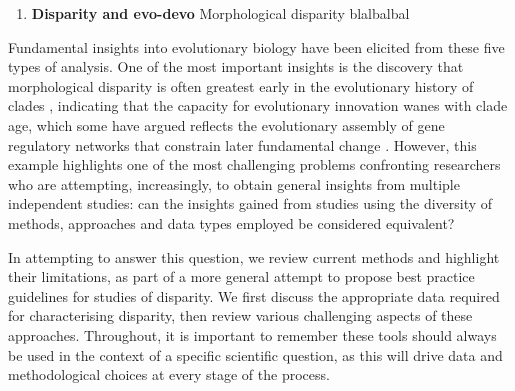 \documentclass[12pt,letterpaper]{article}
\begin{document}
\begin{enumerate}
	\item \textbf{Disparity and evo-devo} Morphological disparity blalbalbal

\end{enumerate}

Fundamental insights into evolutionary biology have been elicited from these five types of analysis.
One of the most important insights is the discovery that morphological disparity is often greatest early in the evolutionary history of clades \citep{Foote1997-nl, Erwin2007-jz, Hughes2013-td}, indicating that the capacity for evolutionary innovation wanes with clade age, which some have argued reflects the evolutionary assembly of gene regulatory networks that constrain later fundamental change  \citep{Erwin2007-jz, Hughes2013-td}.
However, this example highlights one of the most challenging problems confronting researchers who are attempting, increasingly, to obtain general insights from multiple independent studies: can the insights gained from studies using the diversity of methods, approaches and data types employed be considered equivalent?

In attempting to answer this question, we review current methods and highlight their limitations, as part of a more general attempt to propose best practice guidelines for studies of disparity.
We first discuss the appropriate data required for characterising disparity, then review various challenging aspects of these approaches.
Throughout, it is important to remember these tools should always be used in the context of a specific scientific question, as this will drive data and methodological choices at every stage of the process.
\end{document}
